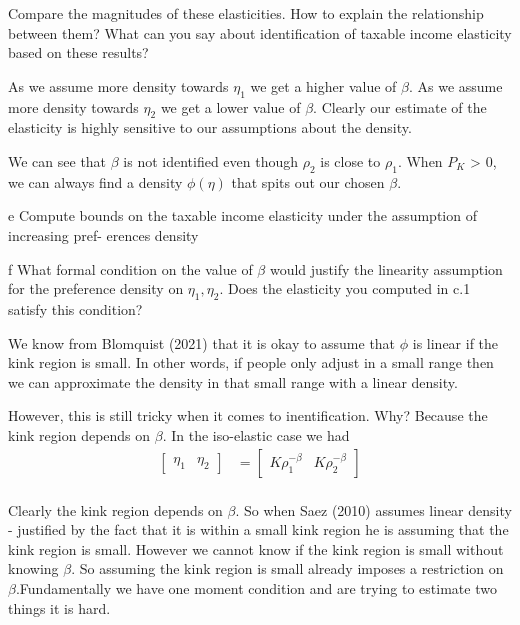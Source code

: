 \documentclass{article}
\begin{document}
\pagebreak
\begin{problem}
Compare the magnitudes of these elasticities. How to explain the relationship between them? What can you say about identification of taxable income elasticity based on these results?
\end{problem}
\begin{solution}

As we assume more density towards $\eta_{1}$ we get a higher value
of $\beta$. As we assume more density towards $\eta_{2}$ we get
a lower value of $\beta$. Clearly our estimate of the elasticity
is highly sensitive to our assumptions about the density. 

We can see that $\beta$ is not identified even though $\rho_{2}$
is close to $\rho_{1}$. When $P_{K}$ > 0, we can always find a density
$\phi\left(\eta\right)$ that spits out our chosen $\beta$.
\end{solution}

\begin{problem}{e}
Compute bounds on the taxable income elasticity under the assumption of increasing pref- erences density
\end{problem}
\begin{solution}
\end{solution}

\begin{problem}{f}
What formal condition on the value of $\beta$ would justify the linearity assumption for the preference density on $\eta_1, \eta_2$. Does the elasticity you computed in c.1 satisfy this condition?
\end{problem}
\begin{solution}

We know from Blomquist (2021) that it is okay to assume that $\phi$
is linear if the kink region is small. In other words, if people only
adjust in a small range then we can approximate the density in that
small range with a linear density. 

However, this is still tricky when it comes to inentification. Why?
Because the kink region depends on $\beta$. In the iso-elastic case
we had
\begin{align*}
\begin{bmatrix}\eta_{1} & \eta_{2}\end{bmatrix} & =\begin{bmatrix}K\rho_{1}^{-\beta} & K\rho_{2}^{-\beta}\end{bmatrix}\\
\end{align*}

Clearly the kink region depends on $\beta$. So when Saez (2010) assumes
linear density - justified by the fact that it is within a small kink
region he is assuming that the kink region is small. However we cannot
know if the kink region is small without knowing $\beta$. So assuming
the kink region is small already imposes a restriction on $\beta$.Fundamentally
we have one moment condition and are trying to estimate two things
it is hard. 
\end{solution}
\end{document}
